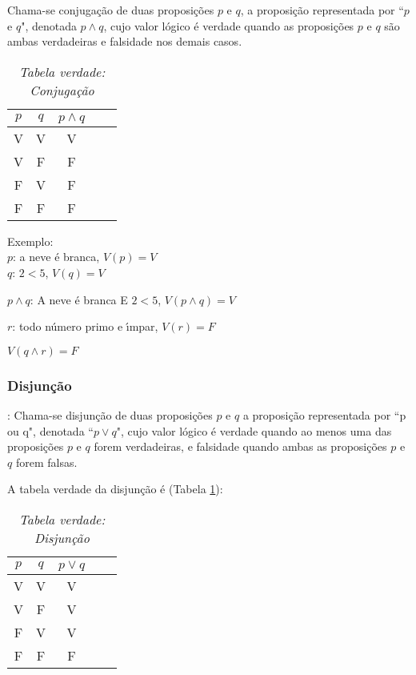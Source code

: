 \begin{definicao}[Conjuga{\c c}{\~a}o] Chama-se conjuga{\c c}{\~a}o de duas proposi{\c c}{\~o}es $p$ e $q$, a proposi{\c c}{\~a}o representada por ``$p$ e $q$", denotada $p\wedge q$, cujo valor l{\'o}gico {\'e} verdade quando as proposi{\c c}{\~o}es $p$ e $q$ s{\~a}o ambas verdadeiras e falsidade nos demais casos.\end{definicao}
\begin{table}[h]
   \centering 
   \setlength{\arrayrulewidth}{0,5\arrayrulewidth}
   \caption{\it Tabela verdade: Conjuga{\c c}{\~a}o}
   \begin{tabular}{|c|c|c|c|c|} 
      \hline
      $p$ & $q$ & $p\wedge q$ \\
      \hline
      V & V & V \\
      \hline
      V & F & F \\
      \hline
      F & V & F \\
      \hline
      F & F & F \\
      \hline
   \end{tabular}
\end{table}

Exemplo:\\
\textbf{$p$}: a neve {\'e} branca, $V(p)=V$\\
\textbf{$q$}: $2<5$, $V(q)=V$
\begin{center}
\textbf{$p\wedge q$}: A neve {\'e} branca E $2<5$, $V(p\wedge q)=V$
\end{center}

\textbf{$r$}: todo n{\'u}mero primo e {\'\i}mpar, $V(r)=F$
\begin{center}
$V(q\wedge r)=F$
\end{center}

\subsubsection{Disjun{\c c}{\~a}o}
\begin{definicao}[Disjun{\c c}{\~a}o]: Chama-se disjun{\c c}{\~a}o de duas proposi{\c c}{\~o}es $p$ e $q$ a proposi{\c c}{\~a}o representada por ``p ou q", denotada ``$p\vee q$", cujo valor l{\'o}gico {\'e} verdade quando ao menos uma das proposi{\c c}{\~o}es $p$ e $q$ forem verdadeiras, e falsidade quando ambas as proposi{\c c}{\~o}es $p$ e $q$ forem falsas.\end{definicao}

A tabela verdade da disjun{\c c}{\~a}o {\'e} (Tabela \ref{disjuncao}):
\begin{table}[h]
   \centering 
   \setlength{\arrayrulewidth}{0,5\arrayrulewidth}
   \caption{\it Tabela verdade: Disjun{\c c}{\~a}o}
   \begin{tabular}{|c|c|c|c|c|} 
      \hline
      $p$ & $q$ & $p\vee q$ \\
     \hline
      V & V & V \\
      \hline
      V & F & V \\
      \hline
      F & V & V \\
      \hline
      F & F & F \\
      \hline
   \end{tabular}
\label{disjuncao}
\end{table}

